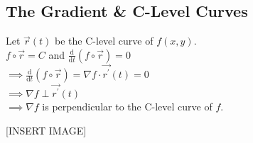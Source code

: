 \subsection{The Gradient \& C-Level Curves}
\noindent
Let $\vec{r}(t)$ be the C-level curve of $f(x, y)$.\\
\indent
$f\circ\vec{r} = C$ and $\frac{\mathrm{d}}{\mathrm{d}t}(f\circ\vec{r}) = 0$\\
\indent
$\implies \frac{\mathrm{d}}{\mathrm{d}t}(f\circ\vec{r}) = \nabla f\cdot\vec{r^\prime}(t) = 0$\\
\indent
$\implies \nabla f\perp\vec{r^\prime}(t)$\\
\indent
$\implies \nabla f$ is perpendicular to the C-level curve of $f$.

[INSERT IMAGE]
